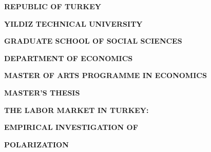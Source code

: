 \begin{titlepage}
\begin{center}
\textbf{REPUBLIC OF TURKEY }
\par\end{center}

\begin{center}
\textbf{YILDIZ TECHNICAL UNIVERSITY }
\par\end{center}

\begin{center}
\textbf{GRADUATE SCHOOL OF SOCIAL SCIENCES }
\par\end{center}

\begin{center}
\textbf{DEPARTMENT OF ECONOMICS }
\par\end{center}

\begin{center}
\textbf{MASTER OF ARTS PROGRAMME IN ECONOMICS }
\par\end{center}

\begin{center}
\vspace{6pt}
\par\end{center}

\begin{center}
\textbf{MASTER\textquoteright S THESIS}
\par\end{center}

\begin{center}
\vspace{54pt}
\par\end{center}

\begin{center}
\textbf{{\Large THE LABOR MARKET IN TURKEY:}}
\par\end{center}

\begin{center}
{\Large \bfseries EMPIRICAL INVESTIGATION OF}
\par\end{center}

\begin{center}
{\Large \bfseries POLARIZATION}
\par\end{center}


\end{titlepage}
